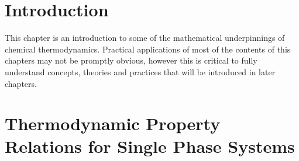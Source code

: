 \localtableofcontents
   

\section{Introduction}\label{Chapter:ThermodynamicPropertiesPureFluids:Section:Introduction}
   This chapter is an introduction to some of the mathematical underpinnings of chemical thermodynamics. Practical applications of most of the contents of this chapters may not be promptly obvious, however this is critical to fully understand concepts, theories and practices that will be introduced in later chapters.

\section{Thermodynamic Property Relations for Single Phase Systems}\label{Chapter:ThermodynamicPropertiesPureFluids:Section:ThermodynamicPropertiesSinglePhase}
